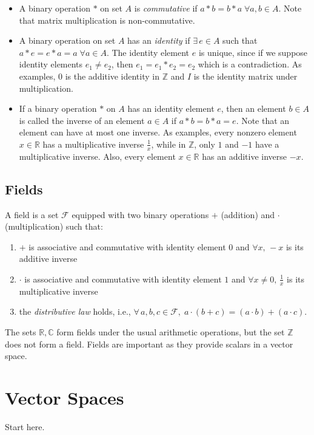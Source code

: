 \documentclass[10pt]{article}
\begin{document}
\begin{itemize}
    \item A binary operation $*$ on set $A$ is \textit{commutative} if $a*b = b*a \; \forall a,b \in A$. Note that matrix multiplication is non-commutative.
    \item A binary operation on set $A$ has an \textit{identity} if $\exists \, e \in A$ such that $a*e = e*a = a \; \forall a \in A$. The identity element $e$ is unique, since if we suppose identity elements $e_1\neq e_2$, then $e_1 = e_1*e_2 = e_2$ which is a contradiction. As examples, $0$ is the additive identity in $\mathbb{Z}$ and $I$ is the identity matrix under multiplication.
    \item If a binary operation $*$ on $A$ has an identity element $e$, then an element $b \in A$ is called the inverse of an element $a \in A$ if $a*b =b*a=e$. Note that an element can have at most one inverse. As examples, every nonzero element $x \in \mathbb{R}$ has a multiplicative inverse $\frac{1}{x}$, while in $\mathbb{Z}$, only $1$ and $-1$ have a multiplicative inverse. Also, every element $x \in \mathbb{R}$ has an additive inverse $-x$.
\end{itemize}

\subsection{Fields}
A field is a set $\mathcal{F}$ equipped with two binary operations $+$ (addition) and $\cdot$ (multiplication) such that:
\begin{enumerate}
    \item $+$  is associative and commutative with identity element $0$ and $\forall x, \, -x$ is its additive inverse
    \item $\cdot$ is associative and commutative with identity element $1$ and $\forall x \neq 0, \, \frac{1}{x}$ is its multiplicative inverse
    \item the \textit{distributive law} holds, i.e., $\forall\, a, b, c \in \mathcal{F}, \; a \cdot (b + c) = (a \cdot b) + (a \cdot c)$.
\end{enumerate}

The sets $\mathbb{R}, \mathbb{C}$ form fields under the usual arithmetic operations, but the set $\mathbb{Z}$ does not form a field. Fields are important as they provide scalars in a vector space.

\section{Vector Spaces}
Start here.
\end{document}
